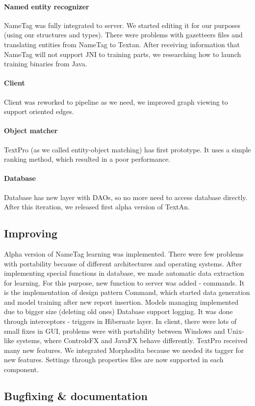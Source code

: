 \paragraph{Named entity recognizer} NameTag was fully integrated to server. We started editing it for our purposes (using our structures and types). There were problems with gazetteers files and translating entities from NameTag to Textan.
After receiving information that NameTag will not support JNI to training parts, we researching how to launch training binaries from Java.
\paragraph{Client} Client was reworked to pipeline as we need, we improved graph viewing to support oriented edges.
\paragraph{Object matcher} TextPro (as we called entity-object matching) has first prototype. It uses a simple ranking method, which resulted in a poor performance. 
\paragraph{Database} Database has new layer with DAOs, so no more need to access database directly.
After this iteration, we released first alpha version of TextAn.

\subsection{Improving}
Alpha version of NameTag learning was implemented. There were few problems with portability because of different architectures and operating systems. After implementing special functions in database, we made automatic data extraction for learning. For this purpose, new function to server was added - commands. It is the implementation of design pattern Command, which started data generation and model training after new report insertion. Models managing implemented due to bigger size (deleting old ones) 
Database support logging. It was done through interceptors - triggers in Hibernate layer.
In client, there were lots of small fixes in GUI, problems were with portability between Windows and Unix-like systems, where ControlsFX and JavaFX behave differently.
TextPro received many new features. We integrated Morphodita because we needed its tagger for new features.
Settings through properties files are now supported in each component.

\subsection{Bugfixing \& documentation}

